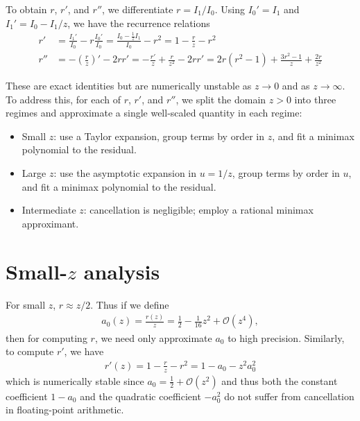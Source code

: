 \documentclass{article}
\begin{document}
To obtain $r$, $r'$, and $r''$, we differentiate $r=I_1/I_0$.
Using $I_0'=I_1$ and $I_1'=I_0 - I_1/z$, we have the recurrence relations
%
\begin{align}
  r'  & = \frac{I_1'}{I_0} - r\frac{I_0'}{I_0} = \frac{I_0 - \frac{1}{z} I_1}{I_0} - r^2 = 1 - \frac{r}{z} - r^2 \label{eq:r-prime-recurrence}                                           \\
  r'' & = -\left(\frac{r}{z}\right)' - 2 r r' = -\frac{r'}{z} + \frac{r}{z^2} - 2 r r' = 2 r (r^2 - 1) + \frac{3 r^2 - 1}{z} + \frac{2 r}{z^2} \label{eq:r-second-derivative-recurrence}
\end{align}

These are exact identities but are numerically unstable as $z \to 0$ and as $z \to \infty$.
To address this, for each of $r$, $r'$, and $r''$, we split the domain $z>0$ into three regimes and approximate a single well-scaled quantity in each regime:
\begin{itemize}
  \item Small $z$: use a Taylor expansion, group terms by order in $z$, and fit a minimax polynomial to the residual.
  \item Large $z$: use the asymptotic expansion in $u = 1/z$, group terms by order in $u$, and fit a minimax polynomial to the residual.
  \item Intermediate $z$: cancellation is negligible; employ a rational minimax approximant.
\end{itemize}

\section{Small-$z$ analysis}

For small $z$, $r \approx z/2$.
Thus if we define
%
\begin{align}
  a_0(z) = \frac{r(z)}{z} = \frac{1}{2} - \frac{1}{16}z^2 + \mathcal{O}(z^4),
\end{align}
%
then for computing $r$, we need only approximate $a_0$ to high precision.
Similarly, to compute $r'$, we have
%
\begin{align}\label{eq:r-prime-reparametrized}
  r'(z) = 1 - \frac{r}{z} - r^2 = 1 - a_0 - z^2 a_0^2
\end{align}
%
which is numerically stable since $a_0 = \frac{1}{2} + \mathcal{O}(z^2)$ and thus both the constant coefficient $1 - a_0$ and the quadratic coefficient $-a_0^2$ do not suffer from cancellation in floating-point arithmetic.
\end{document}
